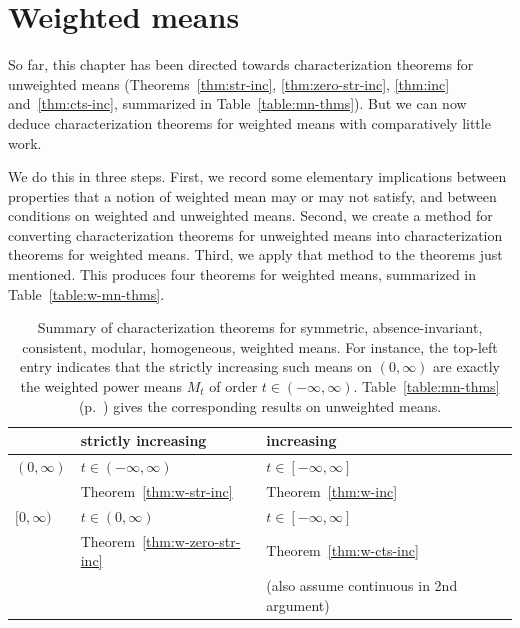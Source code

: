 \section{Weighted means}


So far, this chapter has been directed towards characterization theorems
for unweighted means (Theorems~\ref{thm:str-inc}, \ref{thm:zero-str-inc},
\ref{thm:inc} and~\ref{thm:cts-inc}, summarized in
Table~\ref{table:mn-thms}).  But we can now deduce characterization
theorems for weighted means with comparatively little work.

We do this in three steps.  First, we record some elementary implications
between properties that a notion of weighted mean may or may not
satisfy, and between conditions on weighted and unweighted means.  Second,
we create a method for converting characterization theorems for unweighted
means into characterization theorems for weighted means.  Third, we apply
that method to the theorems just mentioned.  This produces four theorems
for weighted means, summarized in Table~\ref{table:w-mn-thms}.

\begin{table}
\centering
\normalsize
\begin{tabular}{|l|l|l|}
\hline
                &
strictly increasing             &increasing     \\
\hline          
$(0, \infty)$   &
$t \in (-\infty, \infty)$       &$t \in [-\infty, \infty]$      \\
                &
Theorem~\ref{thm:w-str-inc}     &Theorem~\ref{thm:w-inc}        \\
\hline
$[0, \infty)$   &
$t \in (0, \infty)$             &$t \in [-\infty, \infty]$      \\
                &
Theorem~\ref{thm:w-zero-str-inc}&Theorem~\ref{thm:w-cts-inc}    \\
                &
                                &
\small(also assume continuous in 2nd argument)  \\
\hline
\end{tabular}
\caption{Summary of characterization theorems for symmetric,
  absence-invariant, consistent, modular, homogeneous, weighted means.  For
  instance, the top-left entry indicates that the strictly increasing such
  means on $(0, \infty)$ are exactly the weighted power means $M_t$ of
  order $t \in (-\infty, \infty)$.  Table~\ref{table:mn-thms}
  (p.~\pageref{table:mn-thms}) gives the corresponding results on
  unweighted means.}  
%
%
%
\index{power mean!characterization of!weighted on $[0, \infty)$}%
\end{table}

